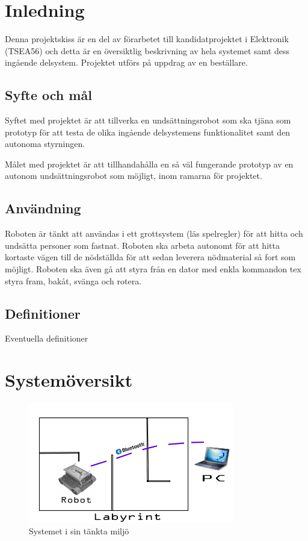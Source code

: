 \documentclass[11pt]{article}
\begin{document}
\pagebreak


\begin{flushleft}

\section{Inledning}
Denna projektskiss är en del av förarbetet till kandidatprojektet i Elektronik (TSEA56) och detta är en översiktlig beskrivning av hela systemet samt dess ingående delsystem. Projektet utförs på uppdrag av en beställare. 

\subsection{Syfte och mål}
Syftet med projektet är att tillverka en undsättningsrobot som ska tjäna som prototyp för att testa de olika ingående delsystemens funktionalitet samt den autonoma styrningen. 

Målet med projektet är att tillhandahålla en så väl fungerande prototyp av en autonom undsättningsrobot som möjligt, inom ramarna för projektet.


\subsection{Användning}
Roboten är tänkt att användas i ett grottsystem (läs spelregler) för att hitta och undsätta personer som fastnat. Roboten ska arbeta autonomt för att hitta kortaste vägen till de nödställda för att sedan leverera nödmaterial så fort som möjligt. Roboten ska även gå att styra från en dator med enkla kommandon tex styra fram, bakåt, svänga och rotera.


\subsection{Definitioner}
Eventuella definitioner

\section{Systemöversikt}
\begin{figure}[h!]
\centering
\caption{Systemet i sin tänkta miljö}
\includegraphics[width=0.8\textwidth]{system_omgivning}
\end{figure}


\end{flushleft}
\end{document}
